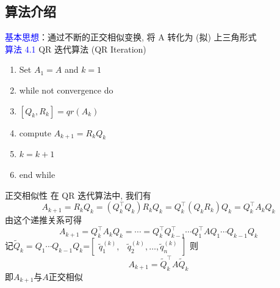 \documentclass[12pt,a4paper]{article}
\begin{document}
\subsection{算法介绍}
\noindent \textcolor{blue}{基本思想}：通过不断的正交相似变换, 将 A 转化为 (拟) 上三角形式\\
\textcolor{blue}{算法 4.1} QR 迭代算法 (QR Iteration)\\
\begin{enumerate}[1:]
\item Set $A_{1}=A$ and $k=1$
\item while not convergence do
\item \qquad $[Q_{k},R_{k}]=qr(A_{k})$
\item \qquad compute $A_{k+1}=R_{k}Q_{k}$
\item \qquad$k=k+1$
\item end while
\end{enumerate}
正交相似性
在 QR 迭代算法中, 我们有
$$
A_{k+1}=R_{k} Q_{k}=\left(Q_{k}^{\top} Q_{k}\right) R_{k} Q_{k}=Q_{k}^{\top}\left(Q_{k} R_{k}\right) Q_{k}=Q_{k}^{\top} A_{k} Q_{k}
$$
由这个递推关系可得
$$
A_{k+1}=Q_{k}^{\top} A_{k} Q_{k}=\cdots=Q_{k}^{\top} Q_{k-1}^{\top} \cdots Q_{1}^{\top} A Q_{1} \cdots Q_{k-1} Q_{k}
$$
记$\tilde{Q}_{k}=Q_{1} \cdots Q_{k-1} Q_{k}$=$\left[\begin{array}{ll}{\tilde{q}_{1}^{(k)},} & {\tilde{q}_{2}^{(k)}, \ldots, \tilde{q}_{n}^{(k)}}\end{array}\right]$
则
\begin{equation} 
A_{k+1}=\tilde{Q}_{k}^{\top} A \tilde{Q}_{k}
\end{equation}
即$A_{k+1}$与$A$正交相似
\end{document}
